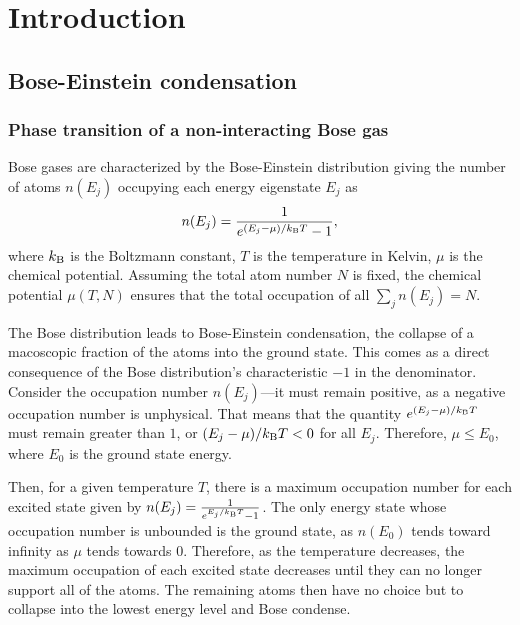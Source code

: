 \renewcommand{\thechapter}{2}

\chapter{Introduction}

\section{Bose-Einstein condensation}

\subsection{Phase transition of a non-interacting Bose gas}
Bose gases are characterized by the Bose-Einstein distribution giving the number of atoms $n(E_j)$ occupying each energy eigenstate $E_j$ as
\begin{equation}
n(E_j) = \frac{1}{e^{(E_j-\mu)/k_{\rm B}T}-1},
\end{equation}
where  $k_{\rm B}$ is the Boltzmann constant, $T$ is the temperature in Kelvin, $\mu$ is the chemical potential. Assuming the total atom number $N$ is fixed, the chemical potential $\mu(T,N)$ ensures that the total occupation of all $\sum_j n(E_j)=N$. 

The Bose distribution leads to Bose-Einstein condensation, the collapse of a macoscopic fraction of the atoms into the ground state. This comes as a direct consequence of the Bose distribution's characteristic $-1$ in the denominator. Consider the occupation number $n(E_j)$---it must remain positive, as a negative occupation number is unphysical. That means that the quantity $e^{(E_j-\mu)/k_{\rm B}T}$ must remain greater than $1$, or $(E_j-\mu)/k_{\rm B}T<0$ for all $E_j$. Therefore, $\mu\leq E_0$, where $E_0$ is the ground state energy. 

Then, for a given temperature $T$, there is a maximum occupation number for each excited state given by $n(E_j) = \frac{1}{e^{E_j/k_{\rm B}T}-1}$. The only energy state whose occupation number is unbounded is the ground state, as $n(E_0)$ tends toward infinity as $\mu$ tends towards $0$. Therefore, as the temperature decreases, the maximum occupation of each excited state decreases until they can no longer support all of the atoms. The remaining atoms then have no choice but to collapse into the lowest energy level and Bose condense. 

